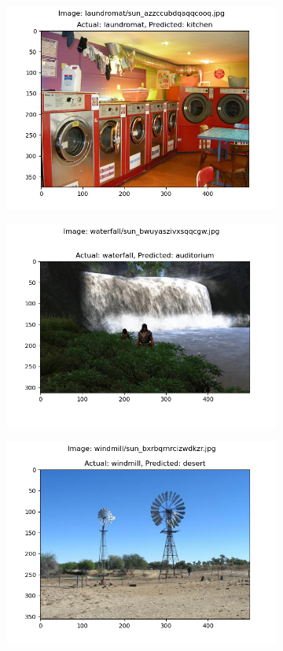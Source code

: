 \documentclass{article} %
\begin{document}
\begin{figure}[h]
\begin{subfigure}[b]{0.333\textwidth}
            \includegraphics[width=\textwidth]{q2,6_case_119.png}
        \end{subfigure}
        \begin{subfigure}[b]{0.333\textwidth}
            \includegraphics[width=\textwidth]{q2,6_case_131.png}
        \end{subfigure}
        \begin{subfigure}[b]{0.333\textwidth}
            \includegraphics[width=\textwidth]{q2,6_case_144.png}

\end{subfigure}
\end{figure}
\end{document}

